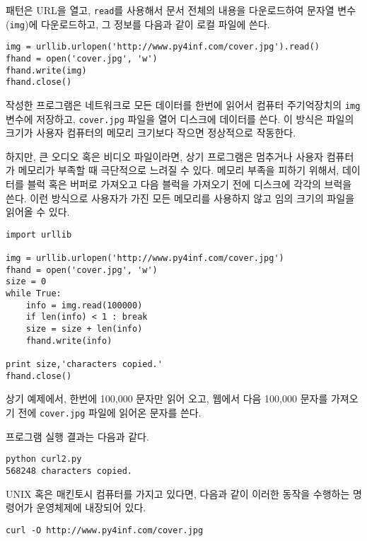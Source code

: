
패턴은 URL을 열고, {\tt read}를 사용해서 문서 전체의 내용을 다운로드하여 문자열 변수({\tt img})에 다운로드하고,
그 정보를 다음과 같이 로컬 파일에 쓴다.

\beforeverb
\begin{verbatim}
img = urllib.urlopen('http://www.py4inf.com/cover.jpg').read()
fhand = open('cover.jpg', 'w')
fhand.write(img)
fhand.close()
\end{verbatim}
\afterverb
%

작성한 프로그램은 네트워크로 모든 데이터를 한번에 읽어서 컴퓨터 주기억장치의 {\tt img} 변수에 저장하고,
{\tt cover.jpg} 파일을 열어 디스크에 데이터를 쓴다. 이 방식은 파일의 크기가 사용자 컴퓨터의 메모리 크기보다 작으면 정상적으로 작동한다.

하지만, 큰 오디오 혹은 비디오 파일이라면, 상기 프로그램은 멈추거나 사용자 컴퓨터가 메모리가 부족할 때 극단적으로 느려질 수 있다.
메모리 부족을 피하기 위해서, 데이터를 블럭 혹은 버퍼로 가져오고 다음 블럭을 가져오기 전에 디스크에 각각의 브럭을 쓴다.
이런 방식으로 사용자가 가진 모든 메모리를 사용하지 않고 임의 크기의 파일을 읽어올 수 있다.

\beforeverb
\begin{verbatim}
import urllib

img = urllib.urlopen('http://www.py4inf.com/cover.jpg')
fhand = open('cover.jpg', 'w')
size = 0
while True:
    info = img.read(100000)
    if len(info) < 1 : break
    size = size + len(info)
    fhand.write(info)

print size,'characters copied.'
fhand.close()
\end{verbatim}
\afterverb
%

상기 예제에서, 한번에 100,000 문자만 읽어 오고, 웹에서 다음 100,000 문자를 가져오기 전에 {\tt cover.jpg} 파일에 읽어온 문자를 쓴다.

프로그램 실행 결과는 다음과 같다.

\beforeverb
\begin{verbatim}
python curl2.py 
568248 characters copied.
\end{verbatim}
\afterverb
%

UNIX 혹은 매킨토시 컴퓨터를 가지고 있다면, 다음과 같이 이러한 동작을 수행하는 명령어가 운영체제에 내장되어 있다.


\beforeverb
\begin{verbatim}
curl -O http://www.py4inf.com/cover.jpg
\end{verbatim}
\afterverb
%

